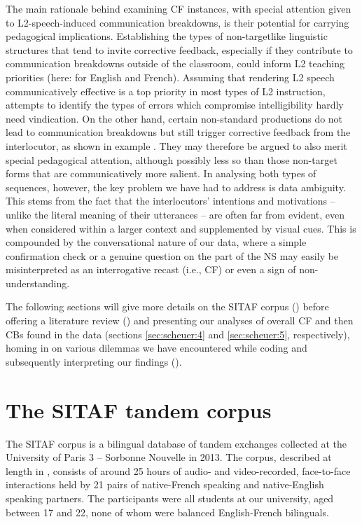 \documentclass[output=paper,colorlinks,citecolor=brown,modfonts,nonflat]{../langscibook}
\begin{document}
The main rationale behind examining CF instances, with special attention given to L2-speech-induced communication breakdowns, is their potential for carrying pedagogical implications. Establishing the types of non-targetlike linguistic structures that tend to invite corrective feedback, especially if they contribute to communication breakdowns outside of the classroom, could inform L2 teaching priorities (here: for English and French). Assuming that rendering L2 speech communicatively effective is a top priority in most types of L2 instruction, attempts to identify the types of errors which compromise intelligibility hardly need vindication. On the other hand, certain non-standard productions do not lead to communication breakdowns but still trigger corrective feedback from the interlocutor, as shown in example . They may therefore be argued to also merit special pedagogical attention, although possibly less so than those non-target forms that are communicatively more salient. In analysing both types of sequences, however, the key problem we have had to address is data ambiguity. This stems from the fact that the interlocutors’ intentions and motivations – unlike the literal meaning of their utterances – are often far from evident, even when considered within a larger context and supplemented by visual cues. This is compounded by the conversational nature of our data, where a simple confirmation check or a genuine question on the part of the NS may easily be misinterpreted as an interrogative recast (i.e., CF) or even a sign of non-understanding.



The following sections will give more details on the SITAF corpus () before offering a literature review () and presenting our analyses of overall CF and then CBs found in the data (sections \ref{sec:scheuer:4} and \ref{sec:scheuer:5}, respectively), homing in on various dilemmas we have encountered while coding and subsequently interpreting our findings (). 

\section{The SITAF tandem corpus}\label{sec:scheuer:2}

The SITAF corpus is a bilingual database of tandem exchanges collected at the University of Paris 3 – Sorbonne Nouvelle in 2013. The corpus, described at length in \citet{HorguesScheuer2015}, consists of around 25 hours of audio- and video-recorded, face-to-face interactions held by 21 pairs of native-French speaking and native-English speaking partners. The participants were all students at our university, aged between 17 and 22, none of whom were balanced English-French bilinguals. 
\end{document}
